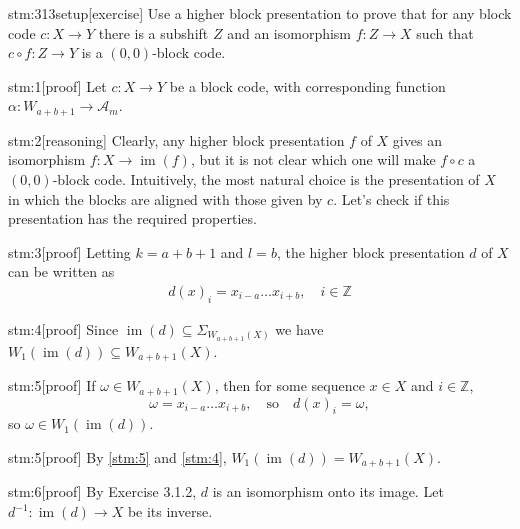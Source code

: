 
\begin{stm}{stm:313setup}[exercise]
Use a higher block presentation to prove that for any block code $c: X \to Y$ there is a subshift $Z$ and an isomorphism $f: Z \to X$ such that $c \circ f: Z \to Y$ is a $(0,0)$-block code.
\end{stm}


\begin{stm}{stm:1}[proof]
Let $c: X \to Y$ be a block code, with corresponding function $\alpha: W_{a+b+1} \to \mathcal{A}_m$.
\end{stm}

\begin{stm}{stm:2}[reasoning]
Clearly, any higher block presentation $f$ of $X$ gives an isomorphism $f: X \to \operatorname{im}(f)$, but it is not clear which one will make $f \circ c$ a $(0,0)$-block code. Intuitively, the most natural choice is the presentation of $X$ in which the blocks are aligned with those given by $c$. Let's check if this presentation has the required properties.
\end{stm}

\begin{stm}{stm:3}[proof]
Letting $k = a + b + 1$ and $l = b$, the higher block presentation $d$ of $X$ can be written as
\begin{align*}
d(x)_i = x_{i-a} \ldots x_{i+b}, \quad i \in \mathbb{Z}
\end{align*}
\end{stm}

\begin{stm}{stm:4}[proof]
Since $\operatorname{im}(d) \subseteq \Sigma_{W_{a+b+1}(X)}$ we have $W_1(\operatorname{im}(d)) \subseteq W_{{a+b+1}}(X)$.
\end{stm}

\begin{stm}{stm:5}[proof]
If $\omega \in W_{a+b+1}(X)$, then for some sequence $x \in X$ and $i \in \mathbb{Z}$,
\[
\omega = x_{i-a} \ldots x_{i+b}, \quad \text{so} \quad d(x)_i = \omega,
\]
so $\omega \in W_1(\operatorname{im}(d))$.
\end{stm}

\begin{stm}{stm:5}[proof]
By \ref{stm:5} and \ref{stm:4}, $W_1(\operatorname{im}(d)) = W_{a+b+1}(X)$.
\end{stm}

\begin{stm}{stm:6}[proof]
By Exercise 3.1.2, $d$ is an isomorphism onto its image. Let $d^{-1}: \operatorname{im}(d) \to X$ be its inverse.
\end{stm}

